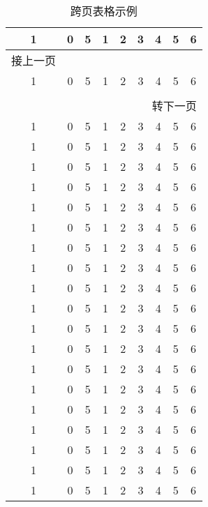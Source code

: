 {\centering
  \begin{longtable}{ccccccccc}
  \caption{跨页表格示例} \\
  \toprule
  1     & 0 & 5  & 1  & 2  & 3  & 4  &  5 & 6 \\
  \midrule
  \endfirsthead

  \multicolumn{1}{l}{接上一页} \\
  \toprule
  1     & 0 & 5  & 1  & 2  & 3  & 4  &  5 & 6 \\
  \midrule
  \endhead

  \bottomrule
  \hline \\
  \multicolumn{9}{r}{{转下一页}} \\
  \endfoot

  \bottomrule
  \endlastfoot    

  1     & 0 & 5  & 1  & 2  & 3  & 4  &  5 & 6 \\
  1     & 0 & 5  & 1  & 2  & 3  & 4  &  5 & 6 \\
  1     & 0 & 5  & 1  & 2  & 3  & 4  &  5 & 6 \\
  1     & 0 & 5  & 1  & 2  & 3  & 4  &  5 & 6 \\
  1     & 0 & 5  & 1  & 2  & 3  & 4  &  5 & 6 \\
  1     & 0 & 5  & 1  & 2  & 3  & 4  &  5 & 6 \\
  1     & 0 & 5  & 1  & 2  & 3  & 4  &  5 & 6 \\
  1     & 0 & 5  & 1  & 2  & 3  & 4  &  5 & 6 \\
  1     & 0 & 5  & 1  & 2  & 3  & 4  &  5 & 6 \\
  1     & 0 & 5  & 1  & 2  & 3  & 4  &  5 & 6 \\
  1     & 0 & 5  & 1  & 2  & 3  & 4  &  5 & 6 \\
  1     & 0 & 5  & 1  & 2  & 3  & 4  &  5 & 6 \\
  1     & 0 & 5  & 1  & 2  & 3  & 4  &  5 & 6 \\
  1     & 0 & 5  & 1  & 2  & 3  & 4  &  5 & 6 \\
  1     & 0 & 5  & 1  & 2  & 3  & 4  &  5 & 6 \\
  1     & 0 & 5  & 1  & 2  & 3  & 4  &  5 & 6 \\
  1     & 0 & 5  & 1  & 2  & 3  & 4  &  5 & 6 \\
  1     & 0 & 5  & 1  & 2  & 3  & 4  &  5 & 6 \\
  1     & 0 & 5  & 1  & 2  & 3  & 4  &  5 & 6 \\
  
  \end{longtable}
}

